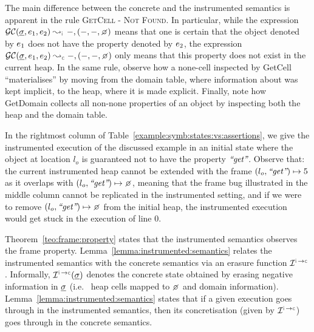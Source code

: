  The main difference between the concrete and the instrumented semantics is apparent in the rule \textsc{GetCell - Not Found}. 
In particular, while the expression $\absgetcellrule{\instrumented}{\istate, \jsilexpr_1, \jsilexpr_2}{-, (-, -, \none)}$ 
means that one is certain that the object denoted by $e_1$ does not have the property 
denoted by $e_2$, the expression $\absgetcellrule{\concrete}{\istate, \jsilexpr_1, \jsilexpr_2}{-, (-, -, \none)}$ 
only means that this property does not exist in the current heap. In the same rule, observe how a none-cell inspected by GetCell ``materialises'' by moving from the domain table, where information about was kept implicit, to the heap, where it is made explicit.
Finally, note how GetDomain collects all non-none properties of an object by inspecting both the heap and the domain table.
 
 
 In the rightmost column of Table~\ref{example:symb:states:vs:assertions}, we give the instrumented 
 execution of the discussed example in an initial state where 
 the object at location $l_o$ is guaranteed not to have the property $\text{{\it ``get''}}$. 
 Observe that:  the current instrumented heap cannot be extended  with 
 the frame $(l_o, \text{{\it ``get''}}) \mapsto 5$ as it overlaps with $(\loc_o, \litstring{get}) \mapsto \none$, meaning 
 that the frame bug illustrated in the middle column cannot be replicated in the instrumented setting,  
 and  if we were to remove $(\loc_o, \litstring{get}) \mapsto \none$ from the initial heap, 
 the instrumented execution would get stuck in the execution of line $0$. 


Theorem~\ref{teo:frame:property} states that the \jsil instrumented semantics observes the 
frame property. Lemma~\ref{lemma:instrumented:semantics} relates the instrumented 
semantics with the concrete semantics via an erasure function  $\interpret{\instconc}{}$. Informally, $\interpret{\instconc}{}(\istate)$
denotes the concrete state obtained by erasing negative information in $\underline{\sigma}$ (i.e.~  
heap cells mapped to $\none$ and domain information). 
Lemma~\ref{lemma:instrumented:semantics} states that if a given execution 
goes through in the instrumented semantics, then its concretisation (given by $\interpret{\instconc}{}$) 
goes through in the concrete semantics. %

